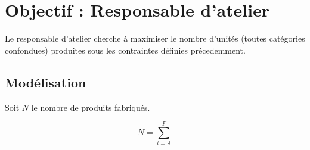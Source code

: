 \newpage
\section{Objectif : Responsable d'atelier}
Le responsable d'atelier cherche à maximiser le nombre d'unités (toutes
catégories confondues) produites sous les contraintes définies précedemment.

\subsection{Modélisation}
Soit $N$ le nombre de produits fabriqués.

\begin{equation}
	N = \sum_{i = A}^{F}
\end{equation} 